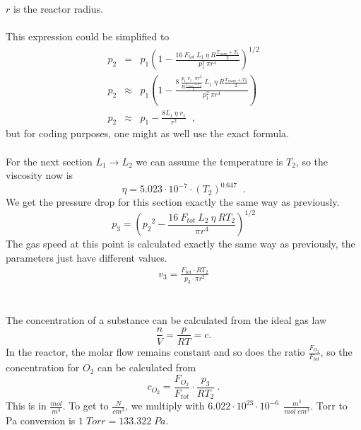\documentclass[10pt, a4paper]{article}
\begin{document}
$r$ is the reactor radius. 
\\
\\
This expression could be simplified to 
\begin{eqnarray*}
p_2 &=& p_1\left(  1 - \frac{16\:F_{tot} \: L_1 \: \eta \: R\frac{T_{room} + T_2}{2}}{p_1^2 \: \pi r^4} \right)^{1/2} \\
p_2 &\approx & p_1 \left( 1 - \frac{8\:\frac{p_1\; v_1 \cdot \pi r^2}{R \frac{T_{room} + T_2}{2} } \: L_1 \; \eta \: R\frac{T_{room} + T_2}{2}}{p_1^2 \: \pi r^4} \right) \\
p_2 &\approx & p_1 - \frac{8L_1 \: \eta \: v_1}{r^2} \;\;,
\end{eqnarray*}
but for coding purposes, one might as well use the exact formula. 
\\
\\
For the next section $L_1 \rightarrow L_2$ we can assume the temperature is $T_2$, so the viscosity now is 
\begin{equation*}
\eta = 5.023\cdot 10^{-7} \cdot \left(T_2 \right)^{0.647}  \;\;. 
\end{equation*}
We get the pressure drop for this section exactly the same way as previously. 
\begin{equation*}
p_3 = \left( {p_2}^2 - \frac{16\:F_{tot} \: L_2 \: \eta \: RT_2}{\pi r^4} \right)^{1/2}
\end{equation*}
The gas speed at this point is calculated exactly the same way as previously, the parameters just have different values. 
\begin{eqnarray*}
v_3 = \frac{F_{tot} \cdot RT_2}{p_3 \cdot \pi r^2}
\end{eqnarray*}
\\
\\
The concentration of a substance can be calculated from the ideal gas law 
\begin{equation*}
\frac{n}{V} = \frac{p}{RT} = c. 
\end{equation*}
In the reactor, the molar flow remains constant and so does the ratio $ \frac{F_{O_2}}{F_{tot}}$, so the concentration for $O_2$ can be calculated from 
\begin{equation*}
c_{O_2} = \frac{F_{O_2}}{F_{tot}} \cdot \frac{p_3}{RT_2} \:. 
\end{equation*}
This is in $ \frac{mol}{m^3}$. To get to $ \frac{N}{cm^3}$, we multiply with $6.022 \cdot 10^{23} \cdot 10^{-6}\:\: \frac{m^3}{mol\;cm^3} $. 
Torr to Pa conversion is $1\;Torr = 133.322\;Pa$. 
\end{document}
